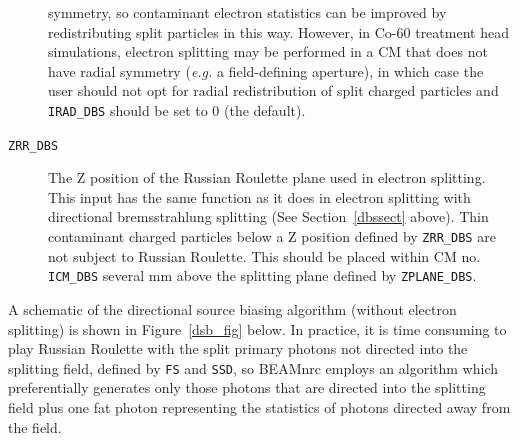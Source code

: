\documentclass[12pt,twoside]{article}
\begin{document}
\begin{description}
symmetry, so contaminant electron statistics can be improved by redistributing split particles in this way.  However, in Co-60 treatment head simulations,
electron splitting may be performed in a CM that does not have radial symmetry ({\em e.g.} a field-defining aperture),
in which case the user should not opt for radial redistribution of split charged particles and {\tt IRAD\_DBS}
should be set to 0 (the default).
\item [{\tt ZRR\_DBS}] The Z position of the Russian Roulette plane
used in electron splitting.  This input has the same function as it does in electron splitting with
directional bremsstrahlung splitting
(See Section~\ref{dbssect} above).  Thin contaminant charged particles below a Z position defined by {\tt ZRR\_DBS}
are not subject to Russian Roulette.  This should be placed within CM no. {\tt ICM\_DBS} several mm above the splitting plane defined by {\tt ZPLANE\_DBS}.
\end{description}

A schematic of the directional source biasing algorithm (without electron splitting) is shown in Figure~\ref{dsb_fig}
below.  In practice, it is time consuming to play Russian Roulette with the split primary photons not directed into
the splitting field, defined by {\tt FS} and {\tt SSD}, so BEAMnrc employs an algorithm which preferentially
generates only those photons that are directed into the splitting field plus one fat photon representing the
statistics of photons directed away from the field.
\end{document}
